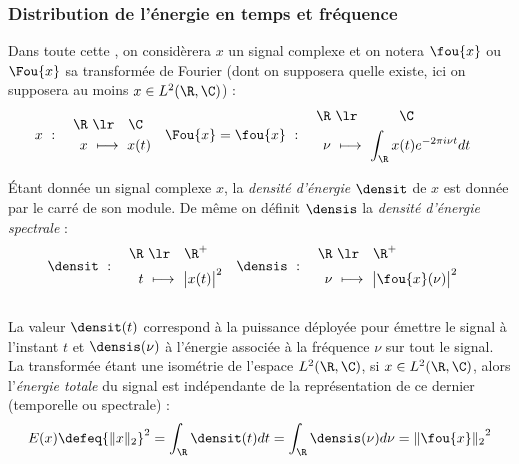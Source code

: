\subsubsection{Distribution de l'énergie en temps et fréquence}\label{subsec:distrib_temp-freq}

Dans toute cette , on considèrera $x$ un signal complexe et on notera $\fou{x}$ ou $\Fou{x}$ sa transformée de Fourier (dont on supposera quelle existe, ici on supposera au moins $x\in L^2(\R, \C)$) :
\begin{align*}
	x\ &:\quad \begin{aligned}\R\ &\lr\quad \C \\ x\ &\longmapsto\ x(t)
	\end{aligned}  &  \Fou{x}=\fou{x}\ &:\quad \begin{aligned}\R\ &\lr\qquad\quad \C \\ \nu\ &\longmapsto\ \int_\R x(t)e^{-2\pi i \nu t}dt
	\end{aligned}
\end{align*}

\begin{definition}\label{def:densi_dE}
	Étant donnée un signal complexe $x$, la \emph{densité d'énergie} $\densit$ de $x$ est donnée par le carré de son module. De même on définit $\densis$ la \emph{densité d'énergie spectrale} :
		\begin{align}\label{eq:densi_dE}
			\densit\ &:\quad \begin{aligned}\R\ &\lr\quad \R^+ \\ t\ &\longmapsto\ \big|x(t)\big|^2 \end{aligned}  
			&
			\densis\ &:\quad \begin{aligned}\R\ &\lr\quad \R^+ \\ \nu\ &\longmapsto\ \big|\fou{x}(\nu)\big|^2 \end{aligned}
		\end{align}
	\\
	La valeur $\densit(t)$ correspond à la puissance déployée pour émettre le signal à l'instant $t$ et $\densis(\nu)$ à l'énergie associée à la fréquence $\nu$ sur tout le signal. 
	\\
	La transformée étant une isométrie de l'espace $L^2(\R,\C)$, si $x\in L^2(\R,\C)$, alors l'\emph{énergie totale} du signal est indépendante de la représentation de ce dernier (temporelle ou spectrale) :
	\begin{equation}\label{eq:parceval}
		E(x) \defeq {\|x\|_2}^2 = \int_\R \densit(t) dt = \int_\R \densis(\nu) d\nu = {\|\fou{x}\|_2}^2
	\end{equation}
\end{definition}

